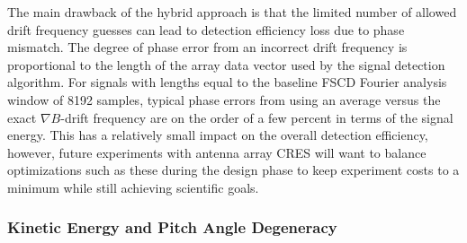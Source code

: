 The main drawback of the hybrid approach is that the limited number of allowed drift frequency guesses can lead to detection efficiency loss due to phase mismatch. The degree of phase error from an incorrect drift frequency is proportional to the length of the array data vector used by the signal detection algorithm. For signals with lengths equal to the baseline FSCD Fourier analysis window of 8192 samples, typical phase errors from using an average versus the exact $\nabla B$-drift frequency are on the order of a few percent in terms of the signal energy. This has a relatively small impact on the overall detection efficiency, however, future experiments with antenna array CRES will want to balance optimizations such as these during the design phase to keep experiment costs to a minimum while still achieving scientific goals.

\subsubsection*{Kinetic Energy and Pitch Angle Degeneracy}

